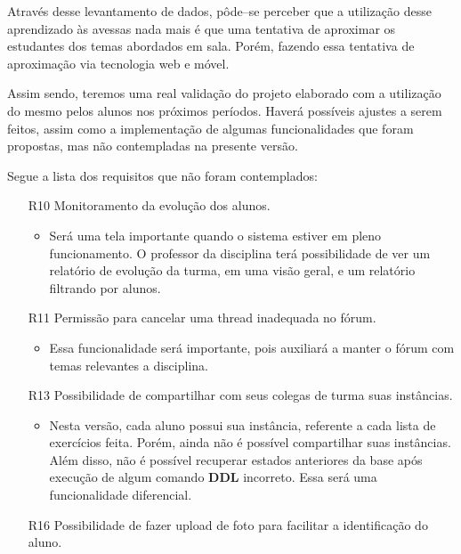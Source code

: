 \documentclass[graduacao,brazil]{ThesisPUC}
\begin{document}
Atrav\'{e}s desse levantamento de dados, p\^{o}de--se perceber que a utiliza\c{c}\~{a}o 
desse aprendizado \`{a}s avessas \cite{FlippedLearning} nada mais \'{e} que uma tentativa
de aproximar os estudantes dos temas abordados em sala. Por\'{e}m, fazendo essa tentativa
de aproxima\c{c}\~{a}o via tecnologia web e m\'{o}vel.

Assim sendo, teremos uma real valida\c{c}\~{a}o do projeto elaborado com a utiliza\c{c}\~{a}o
do mesmo pelos alunos nos pr\'{o}ximos per\'{i}odos. Haver\'{a} poss\'{i}veis ajustes
a serem feitos, assim como a implementa\c{c}\~{a}o de algumas funcionalidades que foram propostas,
mas n\~{a}o contempladas na presente vers\~{a}o.

Segue a lista dos requisitos que n\~{a}o foram contemplados:

\begin{itemize}
  \item [R10] Monitoramento da evolu\c{c}\~{a}o dos alunos.
  \begin{itemize}
    \item Ser\'{a} uma tela importante quando o sistema estiver em pleno funcionamento.
	  O professor da disciplina ter\'{a} possibilidade de ver um relat\'{o}rio de
	  evolu\c{c}\~{a}o da turma, em uma vis\~{a}o geral, e um relat\'{o}rio filtrando
	  por alunos.
  \end{itemize}
  \item [R11] Permiss\~{a}o para cancelar uma thread inadequada no f\'{o}rum.
  \begin{itemize}
    \item Essa funcionalidade ser\'{a} importante, pois auxiliar\'{a} a manter o f\'{o}rum
	  com temas relevantes a disciplina.
  \end{itemize}
  \item [R13] Possibilidade de compartilhar com seus colegas de turma suas inst\^{a}ncias.
  \begin{itemize}
    \item Nesta vers\~{a}o, cada aluno possui sua inst\^{a}ncia, referente a cada lista
	  de exerc\'{i}cios feita. Por\'{e}m, ainda n\~{a}o \'{e} poss\'{i}vel compartilhar suas
	  inst\^{a}ncias. Al\'{e}m disso, n\~{a}o \'{e} poss\'{i}vel recuperar estados anteriores 
	  da base ap\'{o}s execu\c{c}\~{a}o de algum comando \textbf{DDL} incorreto. Essa ser\'{a} 
	  uma funcionalidade diferencial.
  \end{itemize}
  \item [R16] Possibilidade de fazer upload de foto para facilitar a identifica\c{c}\~{a}o do aluno.

\end{itemize}
\end{document}
